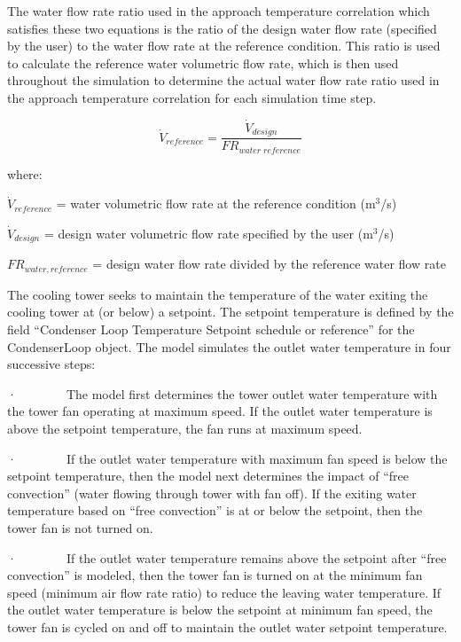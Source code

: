 The water flow rate ratio used in the approach temperature correlation which satisfies these two equations is the ratio of the design water flow rate (specified by the user) to the water flow rate at the reference condition. This ratio is used to calculate the reference water volumetric flow rate, which is then used throughout the simulation to determine the actual water flow rate ratio used in the approach temperature correlation for each simulation time step.

\begin{equation}
{\dot V_{reference}} = \frac{{{{\dot V}_{design}}}}{{F{R_{water\;reference}}}}
\end{equation}

where:

\({\dot V_{reference}}\) = water volumetric flow rate at the reference condition (m\(^{3}\)/s)

\({\dot V_{design}}\) = design water volumetric flow rate specified by the user (m\(^{3}\)/s)

\(F{R_{water,reference}}\) = design water flow rate divided by the reference water flow rate

The cooling tower seeks to maintain the temperature of the water exiting the cooling tower at (or below) a setpoint. The setpoint temperature is defined by the field ``Condenser Loop Temperature Setpoint schedule or reference'' for the CondenserLoop object. The model simulates the outlet water temperature in four successive steps:

·~~~~~~~~The model first determines the tower outlet water temperature with the tower fan operating at maximum speed. If the outlet water temperature is above the setpoint temperature, the fan runs at maximum speed.

·~~~~~~~~If the outlet water temperature with maximum fan speed is below the setpoint temperature, then the model next determines the impact of ``free convection'' (water flowing through tower with fan off). If the exiting water temperature based on ``free convection'' is at or below the setpoint, then the tower fan is not turned on.

·~~~~~~~~If the outlet water temperature remains above the setpoint after ``free convection'' is modeled, then the tower fan is turned on at the minimum fan speed (minimum air flow rate ratio) to reduce the leaving water temperature. If the outlet water temperature is below the setpoint at minimum fan speed, the tower fan is cycled on and off to maintain the outlet water setpoint temperature.

